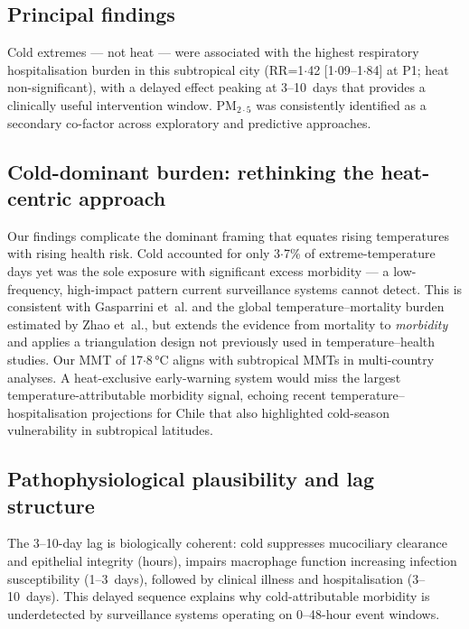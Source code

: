 \documentclass[review,number]{elsarticle}
\begin{document}
\subsection{Principal findings}

Cold extremes --- not heat --- were associated with the highest
respiratory hospitalisation burden in this subtropical city
(RR=1${\cdot}$42 [1${\cdot}$09--1${\cdot}$84] at P1; heat
non-significant), with a delayed effect peaking at 3--10~days that
provides a clinically useful intervention window. $\text{PM}_{2{\cdot}5}$
was consistently identified as a secondary co-factor across
exploratory and predictive approaches.

\subsection{Cold-dominant burden: rethinking the heat-centric approach}

Our findings complicate the dominant framing that equates rising
temperatures with rising health
risk.\cite{Bell2024,McMichael2006} Cold accounted for only
3${\cdot}$7\% of extreme-temperature days yet was the sole exposure
with significant excess morbidity --- a low-frequency, high-impact
pattern current surveillance systems cannot detect. This is
consistent with Gasparrini et~al.\cite{Gasparrini2015} and the
global temperature--mortality burden estimated by Zhao
et~al.,\cite{Zhao2021} but extends the evidence from mortality to
\emph{morbidity} and applies a triangulation design not previously
used in temperature--health studies. Our MMT of 17${\cdot}$8\,°C aligns with subtropical MMTs
in multi-country analyses.\cite{Gasparrini2015} A heat-exclusive early-warning system would miss the largest
temperature-attributable morbidity signal, echoing recent
temperature--hospitalisation projections for Chile that also
highlighted cold-season vulnerability in subtropical
latitudes.\cite{PalmeiroSilva2025}

\subsection{Pathophysiological plausibility and lag structure}

The 3--10-day lag is biologically coherent: cold suppresses
mucociliary clearance and epithelial integrity (hours), impairs
macrophage function increasing infection susceptibility (1--3~days),
followed by clinical illness and hospitalisation
(3--10~days).\cite{Linares2025,Ebi2021} This delayed sequence
explains why cold-attributable morbidity is underdetected by
surveillance systems operating on 0--48-hour event windows.
\end{document}
